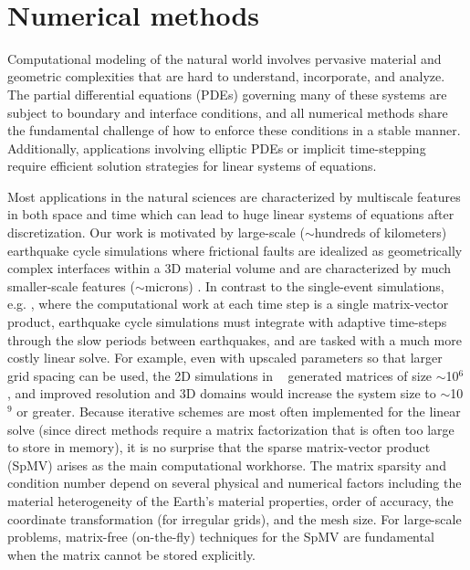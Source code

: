 ~\\
\section{Numerical methods}
Computational modeling of the natural world involves pervasive material and
geometric complexities that are hard to understand, incorporate, and analyze.
%
The partial differential equations (PDEs) governing many of these systems are
subject to boundary and interface conditions, and all numerical methods share
the fundamental challenge of how to enforce these conditions in a stable manner.
Additionally, applications involving elliptic PDEs or implicit time-stepping require efficient solution strategies for linear systems of equations. 


Most applications in the natural sciences are characterized by multiscale features in both space and time which can lead to huge linear systems of equations after discretization. Our work is motivated by large-scale ($\sim$hundreds of kilometers) earthquake cycle simulations where frictional faults are idealized as geometrically complex interfaces within a 3D material volume and are characterized by much smaller-scale features ($\sim$microns) \citep{Erickson2014, Kozdon2012InteractionOW}. In contrast to the single-event simulations, e.g. \citep{Roten}, where the computational work at each time step is a single matrix-vector product, earthquake cycle simulations must integrate with adaptive time-steps through the slow periods between earthquakes, and are tasked with a much more costly linear solve.  For example, even with upscaled parameters so that larger grid spacing can be
used, the 2D simulations in ~\citep{Erickson2014} generated matrices of size
$\sim$10$^6$, and improved resolution and 3D domains would increase the system
size to $\sim$10$^9$ or greater.
Because iterative schemes are most often implemented for the linear solve (since direct methods require a matrix factorization that is often too large to store in memory), it is no surprise that the sparse matrix-vector product (SpMV) arises as the main computational workhorse. The matrix sparsity and condition number depend on several physical and numerical factors including the material heterogeneity of the Earth’s material properties, order of accuracy, the coordinate transformation (for irregular grids), and the mesh size.  For large-scale problems, matrix-free (on-the-fly) techniques for the SpMV are fundamental when the matrix cannot be stored explicitly.

